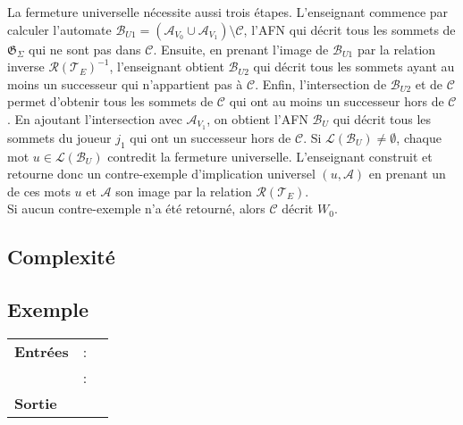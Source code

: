 \documentclass[12pt,a4paper,oneside,titlepage]{report}
\begin{document}
La fermeture universelle nécessite aussi trois étapes. L'enseignant commence par calculer l'automate $\mathcal{B}_{U1}=(\mathcal{A}_{V_0}\cup\mathcal{A}_{V_1})\setminus\mathcal{C}$, l'AFN qui décrit tous les sommets de $\mathfrak{G}_\Sigma$ qui ne sont pas dans $\mathcal{C}$. Ensuite, en prenant l'image de $\mathcal{B}_{U1}$ par la relation inverse $\mathcal{R}(\mathcal{T}_E)^{-1}$, l'enseignant obtient $\mathcal{B}_{U2}$ qui décrit tous les sommets ayant au moins un successeur qui n'appartient pas à $\mathcal{C}$. Enfin, l'intersection de $\mathcal{B}_{U2}$ et de $\mathcal{C}$ permet d'obtenir tous les sommets de $\mathcal{C}$ qui ont au moins un successeur hors de $\mathcal{C}$. En ajoutant l'intersection avec $\mathcal{A}_{V_1}$, on obtient l'AFN $\mathcal{B}_U$ qui décrit tous les sommets du joueur $j_1$ qui ont un successeur hors de $\mathcal{C}$. Si $\mathcal{L}(\mathcal{B}_U)\neq\emptyset$, chaque mot $u\in\mathcal{L}(\mathcal{B}_U)$ contredit la fermeture universelle. L'enseignant construit et retourne donc un contre-exemple d'implication universel $(u,\mathcal{A})$ en prenant un de ces mots $u$ et $\mathcal{A}$ son image par la relation $\mathcal{R}(\mathcal{T}_E)$.\\

\noindent Si aucun contre-exemple n'a été retourné, alors $\mathcal{C}$ décrit $W_0$.


\newpage
\subsection{Complexité}
\newpage 
\subsection{Exemple}

\begin{algorithm}[H]
\caption{}\label{}
\hspace*{\algorithmicindent} 
\begin{tabular}{lll}
	\textbf{Entrées} & \textbf{} : &\\
	&\textbf{} : &\\
	\textbf{Sortie} &\multicolumn{2}{l}{}\\
\end{tabular}\\
\begin{algorithmic}[1]
\State 
\end{algorithmic}
\end{algorithm}
\end{document}
